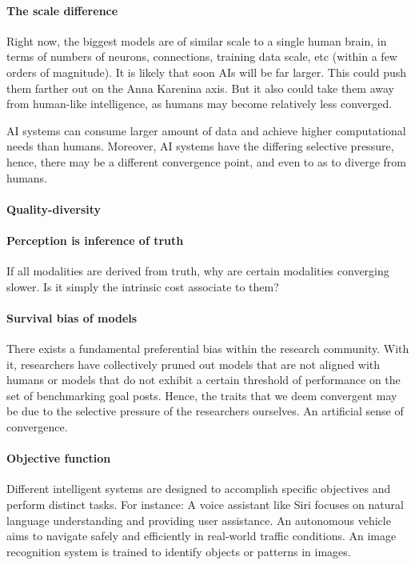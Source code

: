 \documentclass{article}
\theoremstyle{plain}
\theoremstyle{definition}
\theoremstyle{remark}
\begin{document}
\paragraph{The scale difference} Right now, the biggest models are of similar scale to a single human brain, in terms of numbers of neurons, connections, training data scale, etc (within a few orders of magnitude). It is likely that soon AIs will be far larger. This could push them farther out on the Anna Karenina axis. But it also could take them away from human-like intelligence, as humans may become relatively less converged. 

AI systems can consume larger amount of data and achieve higher computational needs than humans. Moreover, AI systems have the differing selective pressure, hence, there may be a different convergence point, and even to as to diverge from humans.

\paragraph{Quality-diversity}

\paragraph{Perception is inference of truth}
If all modalities are derived from truth, why are certain modalities converging slower. Is it simply the intrinsic cost associate to them?

\paragraph{Survival bias of models}
There exists a fundamental preferential bias within the research community. With it, researchers have collectively pruned out models that are not aligned with humans or models that do not exhibit a certain threshold of performance on the set of benchmarking goal posts. Hence, the traits that we deem convergent may be due to the selective pressure of the researchers ourselves. An artificial sense of convergence.

\paragraph{Objective function} 
Different intelligent systems are designed to accomplish specific objectives and perform distinct tasks. For instance:
A voice assistant like Siri focuses on natural language understanding and providing user assistance.
An autonomous vehicle aims to navigate safely and efficiently in real-world traffic conditions.
An image recognition system is trained to identify objects or patterns in images.
\end{document}

